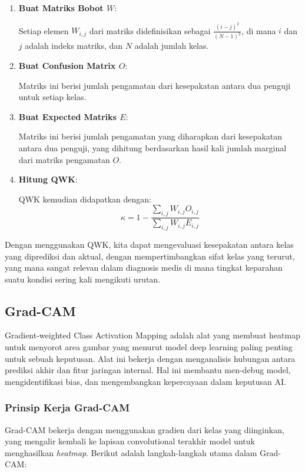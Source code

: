 \begin{enumerate}
    \item \textbf{Buat Matriks Bobot \(W\)}:
    
    Setiap elemen \(W_{i,j}\) dari matriks didefinisikan sebagai \(\frac{(i - j)^2}{(N - 1)^2}\), di mana \(i\) dan \(j\) adalah indeks matriks, dan \(N\) adalah jumlah kelas.
    
    \item \textbf{Buat Confusion Matrix \(O\)}:
    
    Matriks ini berisi jumlah pengamatan dari kesepakatan antara dua penguji untuk setiap kelas.
    
    \item \textbf{Buat Expected Matriks \(E\)}:
     
    Matriks ini berisi jumlah pengamatan yang diharapkan dari kesepakatan antara dua penguji, yang dihitung berdasarkan hasil kali jumlah marginal dari matriks pengamatan \(O\).
    
    \item \textbf{Hitung QWK}:
    
    QWK kemudian didapatkan dengan:
    \[
    \kappa = 1 - \frac{\sum_{i,j} W_{i,j} O_{i,j}}{\sum_{i,j} W_{i,j} E_{i,j}}
    \]
\end{enumerate}

Dengan menggunakan QWK, kita dapat mengevaluasi kesepakatan antara kelas yang diprediksi dan aktual, dengan mempertimbangkan sifat kelas yang terurut, yang mana sangat relevan dalam diagnosis medis di mana tingkat keparahan suatu kondisi sering kali mengikuti urutan.

\subsection{Grad-CAM}
\label{sec:225}

Gradient-weighted Class Activation Mapping adalah alat yang membuat heatmap untuk menyorot area gambar yang menurut model deep learning paling penting untuk sebuah keputusan. Alat ini bekerja dengan menganalisis hubungan antara prediksi akhir dan fitur jaringan internal. Hal ini membantu men-debug model, mengidentifikasi bias, dan mengembangkan kepercayaan dalam keputusan AI.

\subsubsection{Prinsip Kerja Grad-CAM}

Grad-CAM bekerja dengan menggunakan gradien dari kelas yang diinginkan, yang mengalir kembali ke lapisan convolutional terakhir model untuk menghasilkan \emph{heatmap}. Berikut adalah langkah-langkah utama dalam Grad-CAM:

